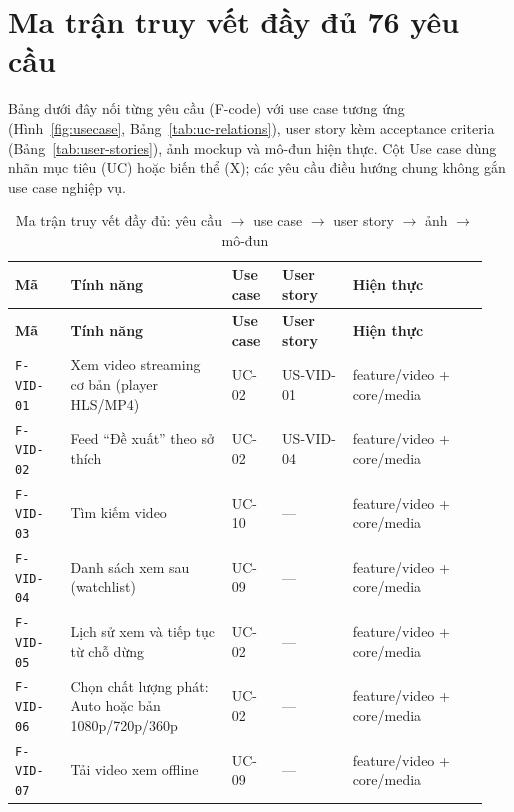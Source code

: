 \section{Ma trận truy vết đầy đủ 76 yêu cầu}
\label{app:trace-full}

Bảng dưới đây nối từng yêu cầu (F-code) với use case tương ứng (Hình~\ref{fig:usecase}, Bảng~\ref{tab:uc-relations}), user story kèm acceptance criteria (Bảng~\ref{tab:user-stories}), ảnh mockup và mô-đun hiện thực. Cột Use case dùng nhãn mục tiêu (UC) hoặc biến thể (X); các yêu cầu điều hướng chung không gắn use case nghiệp vụ.

\begingroup\small\renewcommand{\arraystretch}{1.12}\setlength{\tabcolsep}{3pt}
\begin{longtable}{>{\RaggedRight\arraybackslash}p{0.11\linewidth}>{\RaggedRight\arraybackslash}p{0.32\linewidth}>{\RaggedRight\arraybackslash}p{0.10\linewidth}>{\RaggedRight\arraybackslash}p{0.14\linewidth}>{\RaggedRight\arraybackslash}p{0.27\linewidth}}
\caption{Ma trận truy vết đầy đủ: yêu cầu $\rightarrow$ use case $\rightarrow$ user story $\rightarrow$ ảnh $\rightarrow$ mô-đun}
\label{tab:trace-full}\\
\toprule
\textbf{Mã} & \textbf{Tính năng} & \textbf{Use case} & \textbf{User story} & \textbf{Hiện thực} \\
\midrule
\endfirsthead
\toprule
\textbf{Mã} & \textbf{Tính năng} & \textbf{Use case} & \textbf{User story} & \textbf{Hiện thực} \\
\midrule
\endhead
\bottomrule
\endfoot
\texttt{F-VID-01} & Xem video streaming cơ bản (player HLS/MP4) & UC-02 & US-VID-01 & feature/video + core/media \\
\texttt{F-VID-02} & Feed ``Đề xuất'' theo sở thích & UC-02 & US-VID-04 & feature/video + core/media \\
\texttt{F-VID-03} & Tìm kiếm video & UC-10 & --- & feature/video + core/media \\
\texttt{F-VID-04} & Danh sách xem sau (watchlist) & UC-09 & --- & feature/video + core/media \\
\texttt{F-VID-05} & Lịch sử xem và tiếp tục từ chỗ dừng & UC-02 & --- & feature/video + core/media \\
\texttt{F-VID-06} & Chọn chất lượng phát: Auto hoặc bản 1080p/720p/360p & UC-02 & --- & feature/video + core/media \\
\texttt{F-VID-07} & Tải video xem offline & UC-09 & --- & feature/video + core/media \\

\end{longtable}
